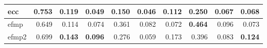 \begin{tabular}{l:rrr:rrr:rrr}
	\acrshort{ecc}                               & 0.753                                           & 0.119          & 0.049          & 0.150     & 0.046 & 0.112 & 0.250 & 0.067 & 0.068 \\
	\hline
	\acrshort{efmp}                              & 0.649
	                                             & 0.114                                           & 0.074          &
	0.361                                        & 0.082                                           & 0.072          & \textbf{0.464} & 0.096     & 0.073                                 \\
	\acrshort{efmp2}                             & 0.699
	                                             & \textbf{0.143}
	                                             & \textbf{0.096}
	                                             & 0.276                                           & 0.059
	                                             & 0.173                                           & 0.396          & 0.083          &
	\textbf{0.124}                                                                                                                                                                       \\
	\bottomrule
\end{tabular}

